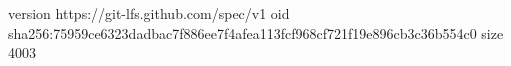 version https://git-lfs.github.com/spec/v1
oid sha256:75959ce6323dadbac7f886ee7f4afea113fcf968cf721f19e896cb3c36b554c0
size 4003
